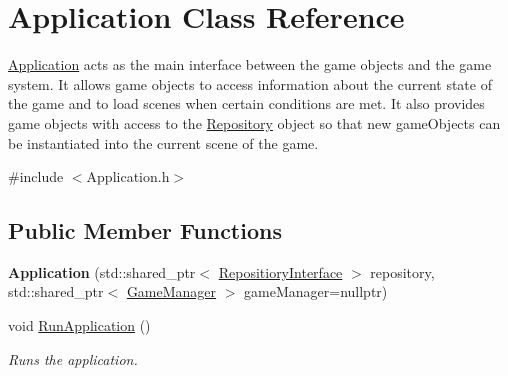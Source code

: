 \hypertarget{class_application}{}\section{Application Class Reference}
\label{class_application}


\hyperlink{class_application}{Application} acts as the main interface between the game objects and the game system. It allows game objects to access information about the current state of the game and to load scenes when certain conditions are met. It also provides game objects with access to the \hyperlink{class_repository}{Repository} object so that new game\+Objects can be instantiated into the current scene of the game.  




{\ttfamily \#include $<$Application.\+h$>$}

\subsection*{Public Member Functions}
\begin{DoxyCompactItemize}
\item 
\mbox{\label{class_application_aa144608f9dff238ac87b51ae86cb414c}} 
{\bfseries Application} (std\+::shared\+\_\+ptr$<$ \hyperlink{class_repositiory_interface}{Repositiory\+Interface} $>$ repository, std\+::shared\+\_\+ptr$<$ \hyperlink{class_game_manager}{Game\+Manager} $>$ game\+Manager=nullptr)
\item 
\mbox{\label{class_application_a12f09b1508e9a881c97786cd07dab53a}} 
void \hyperlink{class_application_a12f09b1508e9a881c97786cd07dab53a}{Run\+Application} ()
\begin{DoxyCompactList}\small\item\em Runs the application. \end{DoxyCompactList}\end{DoxyCompactItemize}
